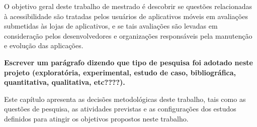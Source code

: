 

O objetivo geral deste trabalho de mestrado é descobrir se questões relacionadas à acessibilidade são tratadas pelos usuários de aplicativos móveis em avaliações submetidas às lojas de aplicativos,
e se tais avaliações são levadas em consideração pelos desenvolvedores e organizações responsáveis pela manutenção e evolução das aplicações. 


\textbf{Escrever um parágrafo dizendo que tipo de pesquisa foi adotado neste projeto (exploratória, experimental, estudo de caso, bibliográfica, quantitativa, qualitativa, etc????).}

Este capítulo apresenta as decisões metodológicas deste trabalho, tais como as questões de pesquisa, as atividades previstas e as configurações dos estudos definidos para atingir os objetivos propostos neste trabalho. 





